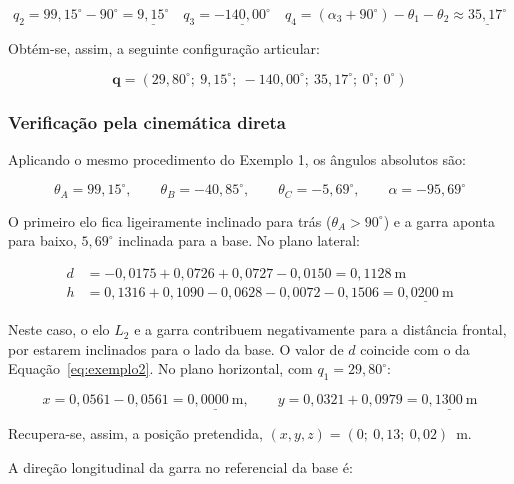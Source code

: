 \begin{equation}
    q_2=99{,}15^\circ-90^\circ=\underline{9{,}15^\circ}\quad
    q_3=\underline{-140{,}00^\circ}\quad
    q_4=(\alpha_3+90^\circ)-\theta_1-\theta_2\approx\underline{35{,}17^\circ}
\end{equation}

Obtém-se, assim, a seguinte configuração articular:

\begin{equation}
    \boxed{
    \mathbf{q}=
    (29{,}80^\circ;\
    9{,}15^\circ;\
    -140{,}00^\circ;\
    35{,}17^\circ;\
    0^\circ;\
    0^\circ)
    }
    \label{eq:ik_exemplo2}
\end{equation}

\subsubsection*{Verificação pela cinemática direta}

Aplicando o mesmo procedimento do Exemplo 1, os ângulos absolutos são:

\begin{equation}
    \theta_A=99{,}15^\circ,\qquad
    \theta_B=-40{,}85^\circ,\qquad
    \theta_C=-5{,}69^\circ,\qquad
    \alpha=-95{,}69^\circ
\end{equation}

O primeiro elo fica ligeiramente inclinado para trás ($\theta_A>90^\circ$) e a garra aponta para baixo, $5{,}69^\circ$ inclinada para a base. No plano lateral:

\begin{align}
    d&=-0{,}0175+0{,}0726+0{,}0727-0{,}0150=0{,}1128\ \text{m}\\
    h&=0{,}1316+0{,}1090-0{,}0628-0{,}0072-0{,}1506=\underline{0{,}0200\ \text{m}}
\end{align}

Neste caso, o elo $L_2$ e a garra contribuem negativamente para a distância frontal, por estarem inclinados para o lado da base. O valor de $d$ coincide com o da Equação~\eqref{eq:exemplo2}. No plano horizontal, com $q_1=29{,}80^\circ$:

\begin{equation}
    x=0{,}0561-0{,}0561=\underline{0{,}0000\ \text{m}},\qquad
    y=0{,}0321+0{,}0979=\underline{0{,}1300\ \text{m}}
\end{equation}

Recupera-se, assim, a posição pretendida, $(x,y,z)=(0;\ 0{,}13;\ 0{,}02)$~m.

A direção longitudinal da garra no referencial da base é:

